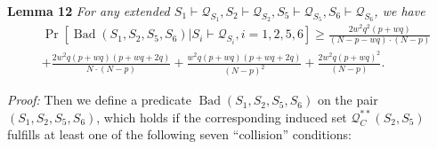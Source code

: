 \noindent \textbf{Lemma 12} \emph{ For any extended $S_{1} \vdash \mathcal{Q}_{S_{1}}, S_{2} \vdash \mathcal{Q}_{S_{2}}, S_{5} \vdash \mathcal{Q}_{S_{5}}, S_{6} \vdash \mathcal{Q}_{S_{6}}$, we have}
\begin{equation}
\begin{aligned}
&\operatorname{Pr}\left[\operatorname{Bad}\left(S_{1}, S_2, S_{5}, S_6\right) | S_{i} \vdash \mathcal{Q}_{S_{i}}, i = 1, 2, 5, 6\right] \geq \frac{2 w^{2} q^{2} (p+w q)}{(N- p- wq) \cdot (N-p)}\\
& +\frac{2 w^{2} q (p+w q)(p+w q+2 q)}{N \cdot (N-p)} +\frac{w^{2} q (p+w q)(p+w q+2 q)}{(N-p)^2} +\frac{2 w^{2} q (p+w q)^{2}}{(N-p)}.
\end{aligned}
\end{equation}

\noindent \emph{Proof:} Then we define a predicate $\operatorname{Bad}\left(S_{1}, S_2, S_{5}, S_6\right)$ on the pair $(S_1,S_2, S_5, S_6)$, which holds if the corresponding induced set $\mathcal{Q}_{C}^{**}\left(S_{2}, S_{5}\right)$ fulfills at least one of the following seven ``collision'' conditions:

